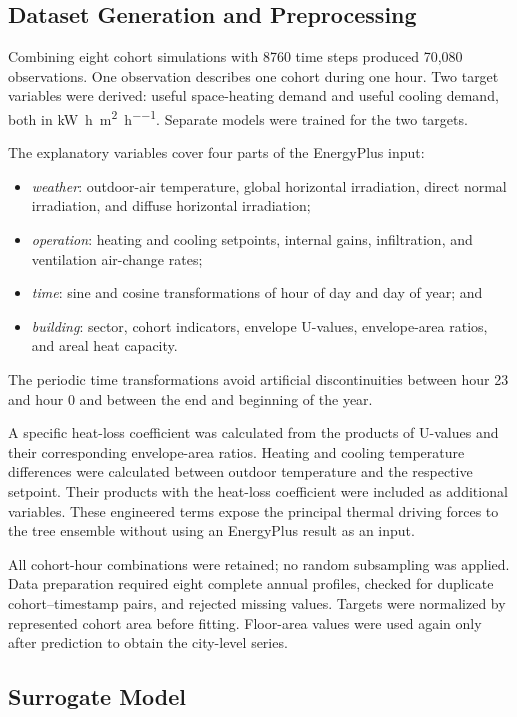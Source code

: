 \documentclass[10pt,twocolumn]{article}
\begin{document}
\subsection{Dataset Generation and Preprocessing}

Combining eight cohort simulations with 8760 time steps produced 70,080
observations. One observation describes one cohort during one hour. Two target
variables were derived: useful space-heating demand and useful cooling demand,
both in \si{\kilo\watt\hour\per\metre\squared\per\hour}. Separate models were
trained for the two targets.

The explanatory variables cover four parts of the EnergyPlus input:
\begin{itemize}
  \item \textit{weather}: outdoor-air temperature, global horizontal
  irradiation, direct normal irradiation, and diffuse horizontal irradiation;
  \item \textit{operation}: heating and cooling setpoints, internal gains,
  infiltration, and ventilation air-change rates;
  \item \textit{time}: sine and cosine transformations of hour of day and day
  of year; and
  \item \textit{building}: sector, cohort indicators, envelope U-values,
  envelope-area ratios, and areal heat capacity.
\end{itemize}
The periodic time transformations avoid artificial discontinuities between
hour 23 and hour 0 and between the end and beginning of the year.

A specific heat-loss coefficient was calculated from the products of U-values
and their corresponding envelope-area ratios. Heating and cooling temperature
differences were calculated between outdoor temperature and the respective
setpoint. Their products with the heat-loss coefficient were included as
additional variables. These engineered terms expose the principal thermal
driving forces to the tree ensemble without using an EnergyPlus result as an
input.

All cohort-hour combinations were retained; no random subsampling was applied.
Data preparation required eight complete annual profiles, checked for
duplicate cohort--timestamp pairs, and rejected missing values. Targets were
normalized by represented cohort area before fitting. Floor-area values were
used again only after prediction to obtain the city-level series.

\subsection{Surrogate Model}
\end{document}
